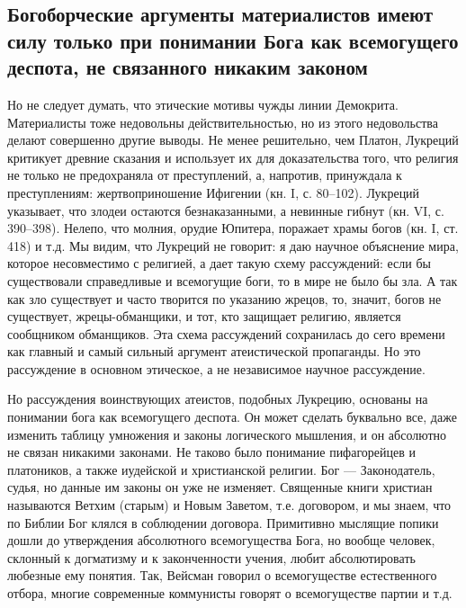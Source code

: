 \subsection{Богоборческие  аргументы материалистов  имеют силу  только
при  понимании Бога  как  всемогущего деспота,  не связанного  никаким
законом}

Но   не   следует   думать,   что   этические   мотивы   чужды   линии
Демокрита.  Материалисты  тоже  недовольны  действительностью,  но  из
этого  недовольства   делают  совершенно   другие  выводы.   Не  менее
решительно,  чем   Платон,  Лукреций  критикует  древние   сказания  и
использует  их  для доказательства  того,  что  религия не  только  не
предохраняла от преступлений, а, напротив, принуждала к преступлениям:
жертвоприношение  Ифигении (кн.  I, с.  80--102). Лукреций  указывает,
что  злодеи остаются  безнаказанными, а  невинные гибнут  (кн. VI,  с.
390--398). Нелепо,  что молния,  орудие Юпитера, поражает  храмы богов
(кн.  I,  ст.  418) и  т.д.  Мы  видим,  что  Лукреций не  говорит:  я
даю  научное  объяснение  мира,  которое несовместимо  с  религией,  а
дает  такую  схему  рассуждений:  если  бы  существовали  справедливые
и  всемогущие  боги,  то  в  мире  не было  бы  зла.  А  так  как  зло
существует и часто  творится по указанию жрецов, то,  значит, богов не
существует,  жрецы-обманщики, и  тот, кто  защищает религию,  является
сообщником  обманщиков.  Эта  схема рассуждений  сохранилась  до  сего
времени как главный и самый сильный аргумент атеистической пропаганды.
Но  это рассуждение  в основном  этическое, а  не независимое  научное
рассуждение.

Но рассуждения  воинствующих атеистов, подобных Лукрецию,  основаны на
понимании  бога как  всемогущего деспота.  Он может  сделать буквально
все, даже изменить таблицу умножения  и законы логического мышления, и
он абсолютно  не связан  никакими законами.  Не таково  было понимание
пифагорейцев и  платоников, а также иудейской  и христианской религии.
Бог --- Законодатель,  судья, но данные им законы он  уже не изменяет.
Священные книги  христиан называются Ветхим (старым)  и Новым Заветом,
т.е. договором,  и мы  знаем, что  по Библии  Бог клялся  в соблюдении
договора. Примитивно мыслящие попики  дошли до утверждения абсолютного
всемогущества  Бога, но  вообще  человек, склонный  к  догматизму и  к
законченности  учения,  любит  абсолютировать  любезные  ему  понятия.
Так,  Вейсман говорил  о  всемогуществе  естественного отбора,  многие
современные коммунисты говорят о всемогуществе партии и т.д.

